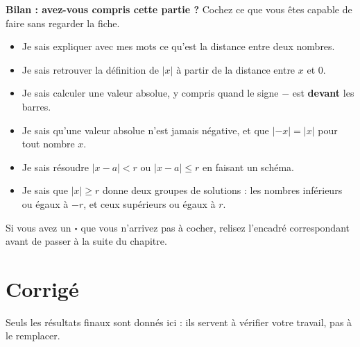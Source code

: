 \documentclass[10pt,a4paper]{article}
\begin{document}
\begin{cbox}
\textbf{Bilan : avez-vous compris cette partie ?} Cochez ce que vous êtes capable de faire sans regarder la fiche.
\begin{itemize}
    \item[$\square$] Je sais expliquer avec mes mots ce qu'est la distance entre deux nombres.
    \item[$\square$] Je sais retrouver la définition de \(|x|\) à partir de la distance entre \(x\) et \(0\).
    \item[$\square$] Je sais calculer une valeur absolue, y compris quand le signe \(-\) est \textbf{devant} les barres.
    \item[$\square$] Je sais qu'une valeur absolue n'est jamais négative, et que \(|-x|=|x|\) pour tout nombre \(x\).
    \item[$\square$] Je sais résoudre \(|x-a|<r\) ou \(|x-a|\leq r\) en faisant un schéma.
    \item[$\square$] Je sais que \(|x|\geq r\) donne deux groupes de solutions : les nombres inférieurs ou égaux à \(-r\), et ceux supérieurs ou égaux à \(r\).
\end{itemize}
Si vous avez un \(\square\) que vous n'arrivez pas à cocher, relisez l'encadré correspondant avant de passer à la suite du chapitre.
\end{cbox}

\newpage
\section*{Corrigé}
\begin{indication}
    Seuls les résultats finaux sont donnés ici : ils servent à vérifier votre travail, pas à le remplacer.
\end{indication}
\end{document}
